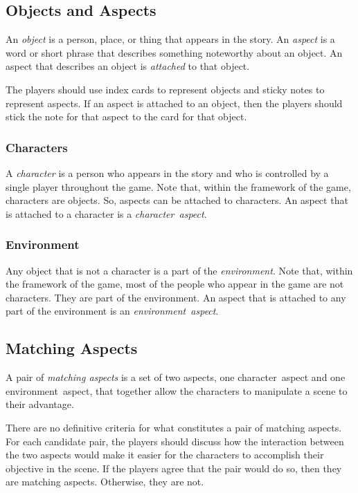 \documentclass[12pt, a5paper, parskip=half-]{scrartcl}
\begin{document}
\subsection*{Objects and Aspects} \label{subsection:objects-and-aspects}
An \emph{object} is a person, place, or thing that appears in the story.
An \emph{aspect} is a word or short phrase that describes something noteworthy about an object.
An aspect that describes an object is \emph{attached} to that object.

The players should use index cards to represent objects and sticky notes to represent aspects. 
If an aspect is attached to an object, then the players should stick the note for that aspect to the card for that object.

\subsubsection*{Characters} \label{subsubsection:characters}
A \emph{character} is a person who appears in the story and who  is controlled by a single player throughout the game. 
Note that, within the framework of the game, characters are objects.
So, aspects can be attached to characters.
An aspect that is attached to a character is a \emph{character~aspect}.

\subsubsection*{Environment} \label{subsubsectioon:environment}
Any object that is not a character is a part of the \emph{environment}.
Note that, within the framework of the game, most of the people who appear in the game are not characters.
They are part of the environment. 
An aspect that is attached to any part of the environment is an \emph{environment~aspect}.

\newpage

\subsection*{Matching Aspects} \label{subsection:matching-aspects}
A pair of \emph{matching aspects} is a set of two aspects, one character~aspect and one environment~aspect, that together allow the characters to manipulate a scene to their advantage.

There are no definitive criteria for what constitutes a pair of matching aspects. 
For each candidate pair, the players should discuss how the interaction between the two aspects would make it easier for the characters to accomplish their objective in the scene. If the players agree that the pair would do so, then they are matching aspects. Otherwise, they are not.
\end{document}
